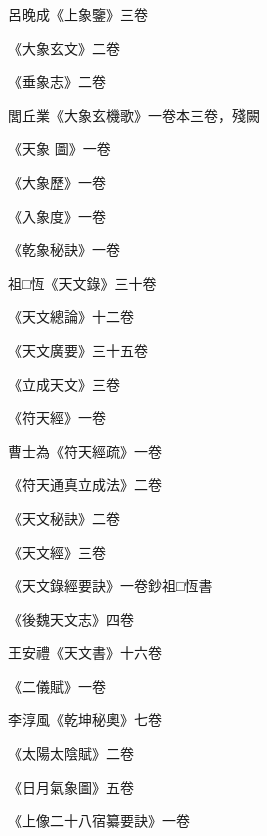 \begin{pinyinscope}
 呂晚成《上象鑒》三卷



 《大象玄文》二卷



 《垂象志》二卷



 閭丘業《大象玄機歌》一卷本三卷，殘闕



 《天象
 圖》一卷



 《大象歷》一卷



 《入象度》一卷



 《乾象秘訣》一卷



 祖□恆《天文錄》三十卷



 《天文總論》十二卷



 《天文廣要》三十五卷



 《立成天文》三卷



 《符天經》一卷



 曹士為《符天經疏》一卷



 《符天通真立成法》二卷



 《天文秘訣》二卷



 《天文經》三卷



 《天文錄經要訣》一卷鈔祖□恆書



 《後魏天文志》四卷



 王安禮《天文書》十六卷



 《二儀賦》一卷



 李淳風《乾坤秘奧》七卷



 《太陽太陰賦》二卷



 《日月氣象圖》五卷



 《上像二十八宿纂要訣》一卷




\end{pinyinscope}
